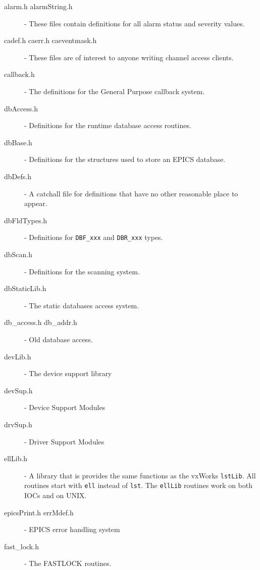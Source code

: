 \begin{description}

\item[alarm.h alarmString.h] - These files contain definitions for all alarm status and severity values.

\item[cadef.h caerr.h caeventmask.h] - These files are of interest to anyone writing channel access clients.

\item[callback.h] - The definitions for the General Purpose callback system.

\item[dbAccess.h] - Definitions for the runtime database access routines.

\item[dbBase.h] - Definitions for the structures used to store an EPICS database.

\item[dbDefs.h] - A catchall file for definitions that have no other reasonable place to appear.

\item[dbFldTypes.h] - Definitions for \verb|DBF_xxx| and \verb|DBR_xxx| types.

\item[dbScan.h] - Definitions for the scanning system.

\item[dbStaticLib.h] - The static databases access system.

\item[db\_access.h db\_addr.h] - Old database access.

\item[devLib.h] - The device support library

\item[devSup.h] - Device Support Modules

\item[drvSup.h] - Driver Support Modules

\item[ellLib.h] - A library that is provides the same functions as the vxWorks \verb|lstLib|. All routines start with \verb|ell| instead of 
\verb|lst|.  The \verb|ellLib| routines work on both IOCs and on UNIX.

\item[epicsPrint.h errMdef.h] - EPICS error handling system

\item[fast\_lock.h] - The FASTLOCK routines.


\end{description}
